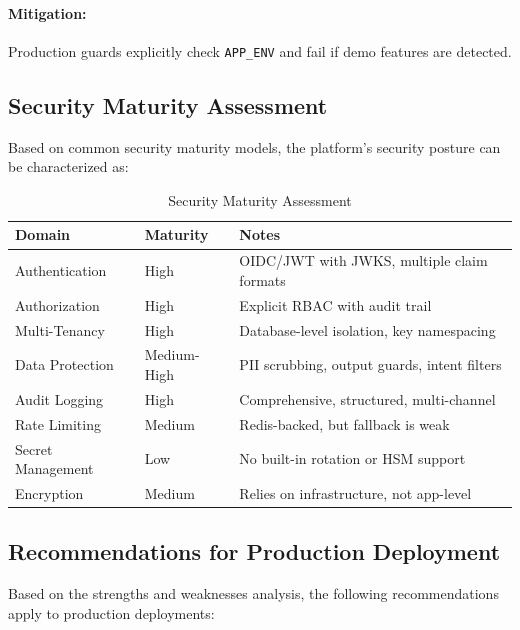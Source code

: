 \paragraph{Mitigation:} Production guards explicitly check \texttt{APP\_ENV} and fail if demo features are detected.

\subsection{Security Maturity Assessment}
\label{subsec:security-maturity}

Based on common security maturity models, the platform's security posture can be characterized as:

\begin{table}[ht]
\centering
\caption{Security Maturity Assessment}
\label{tab:security-maturity}
\begin{tabular}{lll}
\hline
\textbf{Domain} & \textbf{Maturity} & \textbf{Notes} \\
\hline
Authentication & High & OIDC/JWT with JWKS, multiple claim formats \\
Authorization & High & Explicit RBAC with audit trail \\
Multi-Tenancy & High & Database-level isolation, key namespacing \\
Data Protection & Medium-High & PII scrubbing, output guards, intent filters \\
Audit Logging & High & Comprehensive, structured, multi-channel \\
Rate Limiting & Medium & Redis-backed, but fallback is weak \\
Secret Management & Low & No built-in rotation or HSM support \\
Encryption & Medium & Relies on infrastructure, not app-level \\
\hline
\end{tabular}
\end{table}

\subsection{Recommendations for Production Deployment}
\label{subsec:security-recommendations}

Based on the strengths and weaknesses analysis, the following recommendations apply to production deployments:

